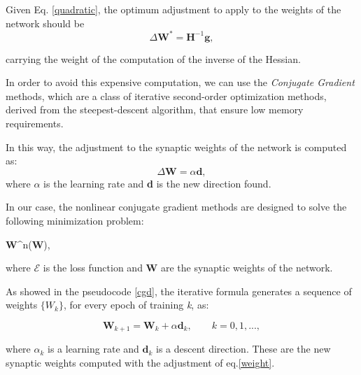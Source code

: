 		Given Eq. \ref{quadratic}, the optimum adjustment to apply to the weights of the network should be
 		\begin{equation}
		 	\label{weight_star}
			\Delta\textbf{W}^* = \textbf{H}^{-1}\textbf{g},
		\end{equation}

		carrying the weight of the computation of the inverse of the Hessian.

		In order to avoid this expensive computation, we can use the \textit{Conjugate Gradient} methods, which are a class of iterative second-order optimization methods, derived from the steepest-descent algorithm, that ensure low memory requirements.

		In this way, the adjustment to the synaptic weights of the network is computed as:
		 \begin{equation}
		 	\label{weight}
		    \Delta\textbf{W} = \alpha\textbf{d},
		 \end{equation}
		where $\alpha$ is the learning rate and \textbf{d} is the new direction found.

		In our case, the nonlinear conjugate gradient methods are designed to solve the following minimization problem:

		\begin{mini}
		  {\textbf{W}\in {}^n}{(\textbf{W}),}{}{}
		\end{mini}

		where $\mathcal{E}$ is the loss function and \textbf{W} are the synaptic weights of the network.

		As showed in the pseudocode \ref{cgd}, the iterative formula generates a sequence of weights $\{W_k\}$, for every epoch of training \textit{k}, as:

		\begin{equation}
			\textbf{W}_{k+1} = \textbf{W}_{k} + \alpha\textbf{d}_k, \text{  }\text{  }\text{  } \textit{k} = 0,1,...,
		\end{equation}

		where $\alpha_k$ is a learning rate and $\textbf{d}_k$ is a descent direction. These are the new synaptic weights computed with the adjustment of eq.\ref{weight}.



